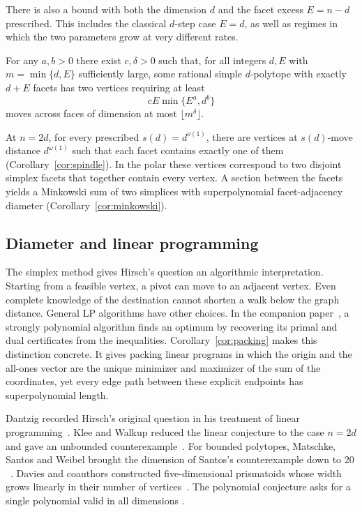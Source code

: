 There is also a bound with both the dimension \(d\) and the facet excess
\(E=n-d\) prescribed. This includes the classical \(d\)-step case
\(E=d\), as well as regimes in which the two parameters grow at very
different rates.

\begin{theorem}\label{thm:excess}
For any \(a,b>0\) there exist \(c,\delta>0\) such that, for all
integers \(d,E\) with \(m=\min\{d,E\}\) sufficiently large, some
rational simple \(d\)-polytope with exactly \(d+E\) facets has two
vertices requiring at least
\[
                         cE\min\{E^a,d^b\}
\]
moves across faces of dimension at most \(\lfloor m^\delta\rfloor\).
\end{theorem}

At \(n=2d\), for every prescribed \(s(d)=d^{o(1)}\), there are
vertices at \(s(d)\)-move distance \(d^{\omega(1)}\) such that each
facet contains exactly one of them (Corollary~\ref{cor:spindle}).
In the polar these vertices correspond to two disjoint simplex facets
that together contain every vertex. A section between the facets yields
a Minkowski sum of two simplices with superpolynomial facet-adjacency
diameter (Corollary~\ref{cor:minkowski}).

\subsection{Diameter and linear programming}

The simplex method gives Hirsch's question an algorithmic interpretation.
Starting from a feasible vertex, a pivot can move to an adjacent vertex.
Even complete knowledge of the destination cannot shorten a walk below
the graph distance. General LP algorithms have other choices.
In the companion paper~\cite{lpcompanion}, a strongly polynomial algorithm
finds an optimum by recovering its primal and dual certificates from the
inequalities. Corollary~\ref{cor:packing} makes this distinction concrete. It gives
packing linear programs in which the origin and the all-ones vector are
the unique minimizer and maximizer of the sum of the coordinates, yet
every edge path between these explicit endpoints has superpolynomial length.

Dantzig recorded Hirsch's original question in his treatment of linear
programming~\cite[p.~160]{dantzig}. Klee and Walkup reduced the linear
conjecture to the case \(n=2d\) and gave an unbounded counterexample~\cite{kw}.
For bounded polytopes, Matschke, Santos and Weibel brought the dimension
of Santos's counterexample down to \(20\)~\cite{msw}. Davies and
coauthors constructed five-dimensional prismatoids whose width grows
linearly in their number of vertices~\cite{davies}. The polynomial
conjecture asks for a single polynomial valid in all dimensions
\cite[Conjecture~1.3]{santos}.

